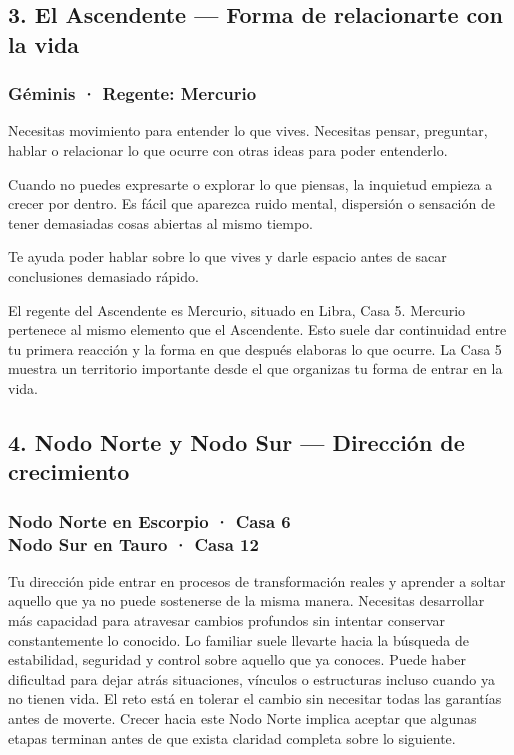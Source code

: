 \documentclass[11pt,a4paper]{article}
\begin{document}
\vspace{0.5cm}


\subsection{3. El Ascendente — Forma de relacionarte con la vida}

\subsubsection*{Géminis · Regente: Mercurio}

Necesitas movimiento para entender lo que vives. Necesitas pensar, preguntar, hablar o relacionar lo que ocurre con otras ideas para poder entenderlo.

Cuando no puedes expresarte o explorar lo que piensas, la inquietud empieza a crecer por dentro. Es fácil que aparezca ruido mental, dispersión o sensación de tener demasiadas cosas abiertas al mismo tiempo.

Te ayuda poder hablar sobre lo que vives y darle espacio antes de sacar conclusiones demasiado rápido.

El regente del Ascendente es Mercurio, situado en Libra, Casa 5. Mercurio pertenece al mismo elemento que el Ascendente. Esto suele dar continuidad entre tu primera reacción y la forma en que después elaboras lo que ocurre. La Casa 5 muestra un territorio importante desde el que organizas tu forma de entrar en la vida.

\vspace{0.5cm}


\subsection{4. Nodo Norte y Nodo Sur — Dirección de crecimiento}

\subsubsection*{Nodo Norte en Escorpio · Casa 6 \\
Nodo Sur en Tauro · Casa 12}

Tu dirección pide entrar en procesos de transformación reales y aprender a soltar aquello que ya no puede sostenerse de la misma manera. Necesitas desarrollar más capacidad para atravesar cambios profundos sin intentar conservar constantemente lo conocido. Lo familiar suele llevarte hacia la búsqueda de estabilidad, seguridad y control sobre aquello que ya conoces. Puede haber dificultad para dejar atrás situaciones, vínculos o estructuras incluso cuando ya no tienen vida. El reto está en tolerar el cambio sin necesitar todas las garantías antes de moverte. Crecer hacia este Nodo Norte implica aceptar que algunas etapas terminan antes de que exista claridad completa sobre lo siguiente.
\end{document}

